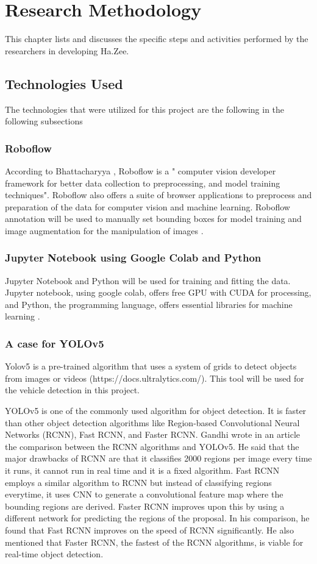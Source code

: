 \chapter{Research Methodology}
This chapter lists and discusses the specific steps and activities performed by the researchers in developing Ha.Zee.

\section{Technologies Used}
The technologies that were utilized for this project are the following in the following subsections

\subsection{Roboflow}
According to Bhattacharyya \citeyear{Bhattacharyya_2020}, Roboflow is a " computer vision developer framework for better data collection to preprocessing, and model training techniques". Roboflow also offers a suite  of browser applications to preprocess and preparation of the data for computer vision and machine learning. Roboflow annotation will be used  to manually set bounding boxes for model training and image augmentation for the manipulation of images \cite{roboflow}.

\subsection{Jupyter Notebook using Google Colab and Python}
Jupyter Notebook and Python will be used for training and fitting the data. Jupyter notebook, using google colab,  offers free GPU with CUDA for processing, and Python, the programming language, offers essential libraries for machine learning \cite{googlecolab}.

\subsection{A case  for YOLOv5}
Yolov5 is a pre-trained algorithm that uses a system of grids to detect objects from images or videos (https://docs.ultralytics.com/). This tool will be used for the vehicle detection in this project. 

	YOLOv5 is one of the commonly used algorithm for object detection. It is faster than other object detection algorithms like Region-based Convolutional Neural Networks (RCNN), Fast RCNN, and Faster RCNN. Gandhi \citeyear{gandhi_2018} wrote in an article the comparison between the RCNN algorithms and YOLOv5. He said that the major drawbacks of RCNN are that it classifies 2000 regions per image every time it runs, it cannot run in real time and it is a fixed algorithm. Fast RCNN employs a similar algorithm to RCNN but instead of classifying regions everytime, it uses CNN to generate a convolutional feature map where the bounding regions are derived. Faster RCNN improves upon this by using a different network for predicting the regions of the proposal. In his comparison, he found that Fast RCNN improves on the speed of RCNN significantly. He also mentioned that Faster RCNN, the fastest of the RCNN algorithms, is viable for real-time object detection. 

